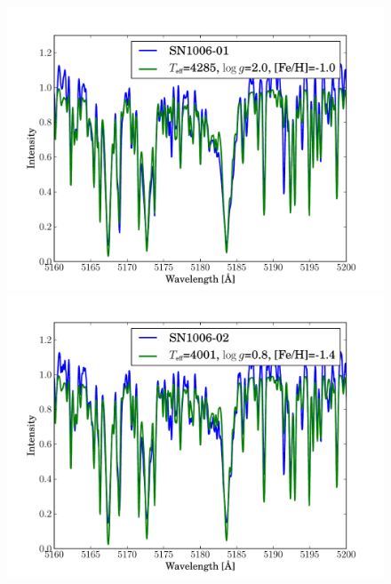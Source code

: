 \begin{figure}[tb] %
   \centering
\includegraphics[width=1.1\textwidth, trim=0 0mm 0 10mm, clip]{chapter_sn1006/plots/gold_spectra/sn1006_01.pdf}
\includegraphics[width=1.1\textwidth, trim=0 0mm 0 10mm, clip]{chapter_sn1006/plots/gold_spectra/sn1006_02.pdf}


\end{figure}
